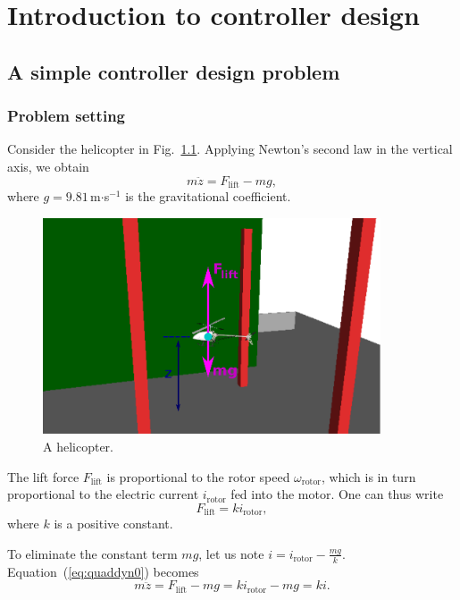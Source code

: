 \documentclass[a4paper,11pt]{report}
\theoremstyle{definition}
\newcommand{\lift}{\mathrm{lift}}
\begin{document}
\chapter{Introduction to controller design}

\section{A simple controller design problem}

\subsection{Problem setting}

Consider the helicopter in Fig.~\ref{fig:helico}. Applying Newton's
second law in the vertical axis, we obtain
\begin{equation}
  \label{eq:quaddyn0}
  m\ddot z = F_\lift - mg,  
\end{equation}
where $g=9.81$\,m$\cdot$s$^{-1}$ is the gravitational coefficient.

\begin{figure}[H]
  \centering
  \includegraphics[width=10cm]{fig/helico.pdf}
  \caption{A helicopter.}
  \label{fig:helico}
\end{figure}


The lift force $F_\lift$ is proportional to the rotor speed
$\omega_\textrm{rotor}$, which is in turn proportional to the electric
current $i_\textrm{rotor}$ fed into the motor. One can thus write
\[
F_\lift = k i_\textrm{rotor},
\]
where $k$ is a positive constant.

To eliminate the constant term $mg$, let us note $i=
i_\textrm{rotor}-\frac{mg}{k}$. Equation~(\ref{eq:quaddyn0}) becomes
\begin{equation}
  \label{eq:quaddyn}
  m\ddot z = F_\lift - mg = ki_\textrm{rotor} - mg = ki.  
\end{equation}
\end{document}
